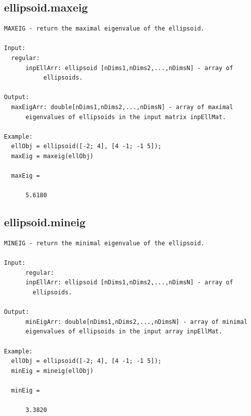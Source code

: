 \documentclass[letterpaper,10pt,english]{sphinxmanual}
\begin{document}
\subsection{ellipsoid.maxeig}
\label{chap_functions:ellipsoid-maxeig}
\begin{Verbatim}[commandchars=\\\{\}]
MAXEIG - return the maximal eigenvalue of the ellipsoid.

Input:
  regular:
      inpEllArr: ellipsoid [nDims1,nDims2,...,nDimsN] - array of
           ellipsoids.

Output:
  maxEigArr: double[nDims1,nDims2,...,nDimsN] - array of maximal
      eigenvalues of ellipsoids in the input matrix inpEllMat.

Example:
  ellObj = ellipsoid([-2; 4], [4 -1; -1 5]);
  maxEig = maxeig(ellObj)

  maxEig =

      5.6180
\end{Verbatim}


\subsection{ellipsoid.mineig}
\label{chap_functions:ellipsoid-mineig}
\begin{Verbatim}[commandchars=\\\{\}]
MINEIG - return the minimal eigenvalue of the ellipsoid.

Input:
      regular:
      inpEllArr: ellipsoid [nDims1,nDims2,...,nDimsN] - array of
        ellipsoids.

Output:
      minEigArr: double[nDims1,nDims2,...,nDimsN] - array of minimal
      eigenvalues of ellipsoids in the input array inpEllMat.

Example:
  ellObj = ellipsoid([-2; 4], [4 -1; -1 5]);
  minEig = mineig(ellObj)

  minEig =

      3.3820
\end{Verbatim}
\end{document}
